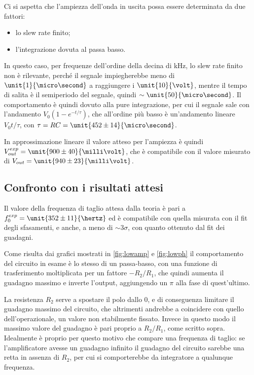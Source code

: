 \documentclass[10pt,a4paper]{article}
\begin{document}
Ci si aspetta che l'ampiezza dell'onda in uscita possa essere determinata da due fattori:
\begin{itemize}
\item lo slew rate finito;
\item l'integrazione dovuta al passa basso.
\end{itemize}

In questo caso, per frequenze dell'ordine della decina di kHz, lo slew rate finito non è rilevante, perché il segnale impiegherebbe meno di $\unit{1}{\micro\second}$ a raggiungere i  $\unit{10}{\volt}$, mentre il tempo di salita è il semiperiodo del segnale, quindi $\sim \unit{50}{\micro\second}$. Il comportamento è quindi dovuto alla pure integrazione, per cui il segnale sale con l'andamento $V_0(1 - e^{-t/\tau})$, che all'ordine più basso è un'andamento lineare $V_0 t/\tau$, con $\tau = R C = \unit{452 \pm 14}{\micro\second}$.

In approssimazione lineare il valore atteso per l'ampiezza è quindi $V_{out}^{exp} = \unit{900 \pm 40}{\milli\volt}$, che è compatibile con il valore misurato di $V_{out} = \unit{940 \pm 23}{\milli\volt}$.


\subsection{Confronto con i risultati attesi}

Il valore della frequenza di taglio attesa dalla teoria è pari a $f_0^{exp} = \unit{352 \pm 11}{\hertz}$ ed è compatibile con quella misurata con il fit degli sfasamenti, e anche, a meno di $\sim 3\sigma$, con quanto ottenuto dal fit dei guadagni.

Come risulta dai grafici mostrati in \figurename{\ref{fig:lowamp}} e \figurename{\ref{fig:lowph}} il comportamento del circuito in esame è lo stesso di un passa-basso, con una funzione di trasferimento moltiplicata per un fattore $-R_2/R_1$, che quindi aumenta il guadagno massimo e inverte l'output, aggiungendo un $\pi$ alla fase di quest'ultimo.

La resistenza $R_2$ serve a spostare il polo dallo 0, e di conseguenza limitare il guadagno massimo del circuito, che altrimenti andrebbe a coincidere con quello dell'operazionale, un valore non stabilmente fissato. Invece in questo modo il massimo valore del guadagno è pari proprio a  $R_2/R_1$, come scritto sopra.
Idealmente è proprio per questo motivo che compare una frequenza di taglio: se l'amplificatore avesse un guadagno infinito il guadagno del circuito sarebbe una retta in assenza di $R_2$, per cui si comporterebbe da integratore a qualunque frequenza.
\end{document}
